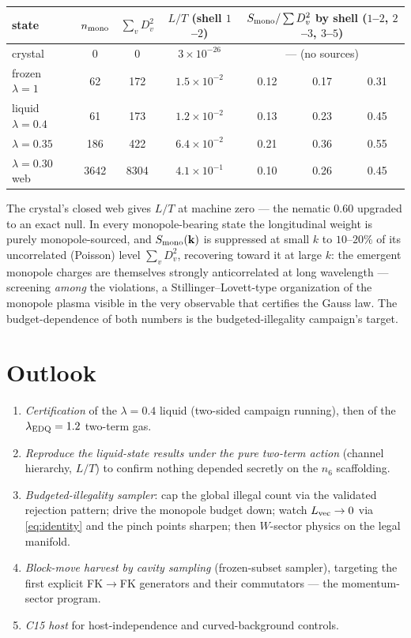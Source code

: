 \documentclass[11pt]{article}
\newcommand{\kv}{\mathbf k}
\begin{document}
\begin{center}
\begin{tabular}{lcccccc}
\toprule
state & $n_{\rm mono}$ & $\sum_v D_v^2$ & $L/T$ (shell $1$--$2$)
& \multicolumn{3}{c}{$S_{\rm mono}/\sum D_v^2$ by shell ($1$--$2$, $2$--$3$, $3$--$5$)} \\
\midrule
crystal & 0 & 0 & $3\times10^{-26}$ & \multicolumn{3}{c}{--- (no sources)} \\
frozen $\lambda=1$ & 62 & 172 & $1.5\times10^{-2}$ & 0.12 & 0.17 & 0.31 \\
liquid $\lambda=0.4$ & 61 & 173 & $1.2\times10^{-2}$ & 0.13 & 0.23 & 0.45 \\
$\lambda=0.35$ & 186 & 422 & $6.4\times10^{-2}$ & 0.21 & 0.36 & 0.55 \\
$\lambda=0.30$ web & 3642 & 8304 & $4.1\times10^{-1}$ & 0.10 & 0.26 & 0.45 \\
\bottomrule
\end{tabular}
\end{center}

\noindent The crystal's closed web gives $L/T$ at machine zero --- the
nematic $0.60$ upgraded to an exact null. In every monopole-bearing state
the longitudinal weight is purely monopole-sourced, and
$S_{\rm mono}(\kv)$ is suppressed at small $k$ to $10$--$20\%$ of its
uncorrelated (Poisson) level $\sum_v D_v^2$, recovering toward it at large
$k$: the emergent monopole charges are themselves strongly anticorrelated
at long wavelength --- screening \emph{among} the violations, a
Stillinger--Lovett-type organization of the monopole plasma visible in the
very observable that certifies the Gauss law. The budget-dependence of both
numbers is the budgeted-illegality campaign's target.

\section{Outlook}
\label{sec:outlook}

\begin{enumerate}
\item \emph{Certification} of the $\lambda=0.4$ liquid (two-sided campaign
running), then of the $\lambda_{\rm EDQ}=1.2$ two-term gas.
\item \emph{Reproduce the liquid-state results under the pure two-term
action} (channel hierarchy, $L/T$) to confirm nothing depended secretly on
the $n_6$ scaffolding.
\item \emph{Budgeted-illegality sampler}: cap the global illegal count via
the validated rejection pattern; drive the monopole budget down; watch
$L_{\rm vec} \to 0$ via \eqref{eq:identity} and the pinch points sharpen;
then $W$-sector physics on the legal manifold.
\item \emph{Block-move harvest by cavity sampling} (frozen-subset sampler),
targeting the first explicit FK$\to$FK generators and their commutators ---
the momentum-sector program.
\item \emph{C15 host} for host-independence and curved-background controls.
\end{enumerate}
\end{document}
